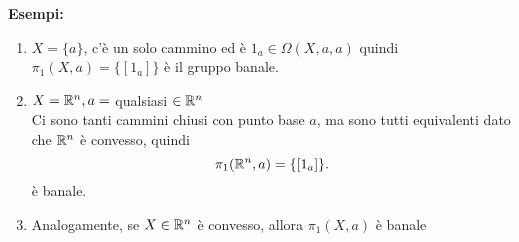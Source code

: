 \documentclass[12px]{article}
\begin{document}
\textbf{Esempi:}
\begin{enumerate}
	\item $X = \{a\}$, c'è un solo cammino ed è $1_a\in \Omega(X,a,a)$ quindi $\pi_1(X,a) = \{[1_a]\}$ è il gruppo banale.
	\item $X = \mathbb{R}^n, a = $ qualsiasi  $\in\mathbb{R}^n$\\
		Ci sono tanti cammini chiusi con punto base $a$, ma sono tutti equivalenti dato che  $\mathbb{R}^n $ è convesso, quindi
		\[
			\pi_1(\mathbb{R}^n,a) = \{[1_a]\}
		.\] 
		è banale.
	\item Analogamente, se $X\in\mathbb{R}^n$ è convesso, allora  $\pi_1(X,a)$ è banale
\end{enumerate}
\end{document}
